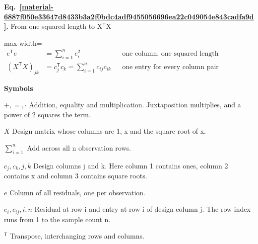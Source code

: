 \documentclass[11pt,a4paper]{article}
\begin{document}
\par\medskip
\noindent\begin{minipage}{\linewidth}
\label{material-6887f050e33647d8433b3a2f0bdc4adf9455056696ea22c049054e843cadfa9d}
\noindent\textbf{Eq.~\ref*{material-6887f050e33647d8433b3a2f0bdc4adf9455056696ea22c049054e843cadfa9d}.} From one squared length to X\ensuremath{{}^{\mathsf T}}X\par\nopagebreak
\begin{center}\begin{adjustbox}{max width=\linewidth}$\displaystyle \begin{aligned}e^{\mathsf T}e&=\sum_{i=1}^n e_i^2 &&\text{one column, one squared length}\\[.65em](X^{\mathsf T}X)_{jk}&=c_j^{\mathsf T}c_k=\sum_{i=1}^n c_{ij}c_{ik} &&\text{one entry for every column pair}\end{aligned}$\end{adjustbox}\end{center}

\par\noindent\textbf{Symbols}

\par\noindent\textbf{\(+,=,\cdot\)} Addition, equality and multiplication. Juxtaposition multiplies, and a power of 2 squares the term.

\par\noindent\textbf{\(X\)} Design matrix whose columns are 1, x and the square root of x.

\par\noindent\textbf{\(\sum_{i=1}^{n}\)} Add across all n observation rows.

\par\noindent\textbf{\(c_j,c_k,j,k\)} Design columns j and k. Here column 1 contains ones, column 2 contains x and column 3 contains square roots.

\par\noindent\textbf{\(e\)} Column of all residuals, one per observation.

\par\noindent\textbf{\(e_i,c_{ij},i,n\)} Residual at row i and entry at row i of design column j. The row index runs from 1 to the sample count n.

\par\noindent\textbf{\({}^{\mathsf T}\)} Transpose, interchanging rows and columns.

\end{minipage}\par
\medskip
\end{document}
